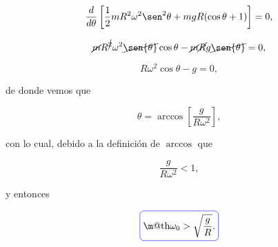 \documentclass[a4paper,10pt]{article}
\makeatletter
\numberwithin{equation}{section}
\newcommand*{\boxcolor}{blue}
\renewcommand{\boxed}[1]{\textcolor{\boxcolor}{%
\tikz[baseline={([yshift=-1ex]current bounding box.center)}] \node [rectangle, minimum width=1ex,rounded corners,draw] {\normalcolor\m@th$\displaystyle#1$};}}
\makeatother
\begin{document}
\begin{equation}
 \frac{d}{d\theta} \left[\frac{1}{2}mR^2\omega^2\sen^2{\theta} + 
 mgR(\cos{\theta} + 1) \right] = 0,
\end{equation}

\begin{equation}
 \cancel{m}R^{\cancel{2}}\omega^2\cancel{\sen{\theta}}\cos{\theta} - \cancel{m}\cancel{R} 
 g\cancel{\sen{\theta}} = 0,
\end{equation}

\begin{equation}
 R\omega^2\cos{\theta} - g = 0,
\end{equation}

de donde vemos que 

\begin{equation}
 \theta = \arccos{\left[\frac{g}{R\omega^2}\right]},
\end{equation}

con lo cual, debido a la definición de $\arccos$ que 

\begin{equation}
 \frac{g}{R\omega^2} < 1,
\end{equation}

y entonces 

\begin{equation}
 \boxed{\omega_0 > \sqrt{\frac{g}{R}}.}
\end{equation}
\end{document}
